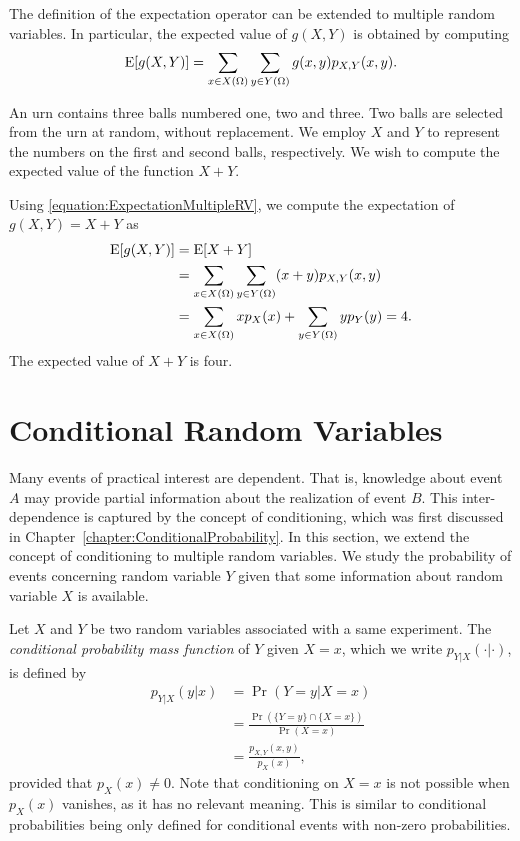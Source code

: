 The definition of the expectation operator can be extended to multiple random variables.
In particular, the expected value of $g(X,Y)$ is obtained by computing
\begin{equation} \label{equation:ExpectationMultipleRV}
\mathrm{E} [g(X,Y)] = \sum_{x \in X(\Omega)} \sum_{y \in Y(\Omega)} g(x,y) p_{X,Y} (x,y) .
\end{equation}

\begin{example}
An urn contains three balls numbered one, two and three.
Two balls are selected from the urn at random, without replacement.
We employ $X$ and $Y$ to represent the numbers on the first and second balls, respectively.
We wish to compute the expected value of the function $X + Y$.

Using \eqref{equation:ExpectationMultipleRV}, we compute the expectation of $g(X,Y) = X + Y$ as
\begin{equation*}
\begin{split}
\mathrm{E} [g(X,Y)] &= \mathrm{E} [X + Y] \\
&= \sum_{x \in X(\Omega)} \sum_{y \in Y(\Omega)} (x + y) p_{X,Y} (x,y) \\
&= \sum_{x \in X(\Omega)} x p_X (x) + \sum_{y \in Y(\Omega)} y p_Y (y)
= 4.
\end{split}
\end{equation*}
The expected value of $X + Y$ is four.
\end{example}


\section{Conditional Random Variables}
\label{section:ConditionalRandomVariables}

Many events of practical interest are dependent.
That is, knowledge about event $A$ may provide partial information about the realization of event $B$.
This inter-dependence is captured by the concept of conditioning, which was first discussed in Chapter~\ref{chapter:ConditionalProbability}.
In this section, we extend the concept of conditioning to multiple random variables.
We study the probability of events concerning random variable $Y$ given that some information about random variable $X$ is available.

Let $X$ and $Y$ be two random variables associated with a same experiment.
The \emph{conditional probability mass function} of $Y$ given $X = x$, which we write $p_{Y|X} (\cdot | \cdot)$, is defined by 
\begin{equation*}
\begin{split}
p_{Y|X} (y|x) &= \Pr ( Y = y | X = x) \\
&= \frac{\Pr (\{Y = y\} \cap \{ X = x \})}{\Pr (X = x)} \\
&= \frac{ p_{X,Y} (x,y) }{p_X(x)},
\end{split}
\end{equation*}
provided that $p_X (x) \neq 0$.
Note that conditioning on $X = x$ is not possible when $p_X (x)$ vanishes, as it has no relevant meaning.
This is similar to conditional probabilities being only defined for conditional events with non-zero probabilities.

